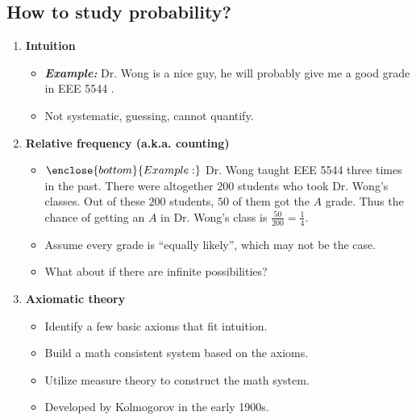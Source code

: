 \subsection{How to study probability?}
\begin{enumerate}
\item \textbf{Intuition}
\begin{itemize}
\item \emph{\bf{Example:} } Dr. Wong is a nice guy, he will probably give me a good grade in EEE 5544 .
\item Not systematic, guessing, cannot quantify.
\end{itemize}

\item \textbf{Relative frequency (a.k.a. counting)} 
\begin{itemize}
\item $\enclose{bottom}{Example:}$ Dr. Wong taught EEE 5544 three times in the
  past. There were altogether $200$ students who took Dr. Wong's
  classes. Out of these $200$ students, $50$ of them got the \(A\) grade.
  Thus the chance of getting an \(A\) in Dr. Wong's class is
  \(\frac{50}{200}=\frac{1}{4}\).
\item Assume every grade is ``equally likely'', which may not be the case.
\item What about if there are infinite possibilities?
\end{itemize}

\item \textbf{Axiomatic theory} 
\begin{itemize}
  \item Identify a few basic axioms that fit intuition.
  \item Build a math consistent system based on the axioms.
  \item Utilize measure theory to construct the math system.
  \item Developed by Kolmogorov in the early 1900s.
\end{itemize}
\end{enumerate}
